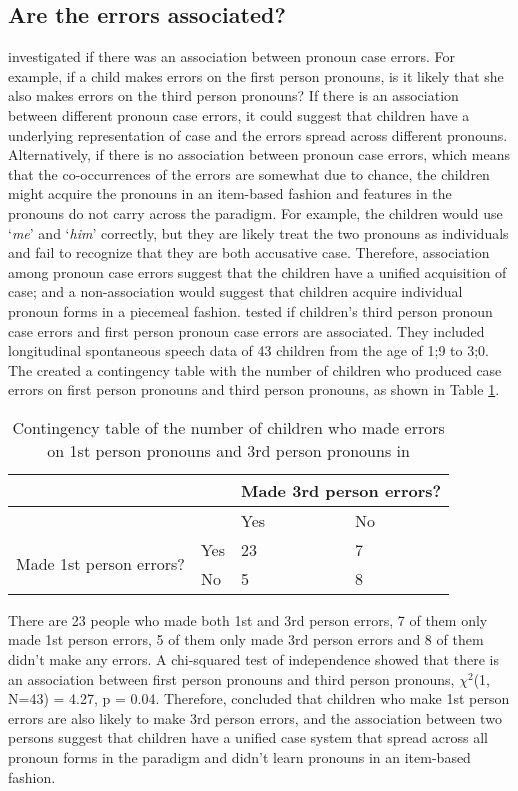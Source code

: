\subsection{Are the errors associated?}
\cite{fitzgerald2017case} investigated if there was an association between pronoun case errors. For example, if a child makes errors on the first person pronouns, is it likely that she also makes errors on the third person pronouns? If there is an association between different pronoun case errors, it could suggest that children have a underlying representation of case and the errors spread across different pronouns. Alternatively, if there is no association between pronoun case errors, which means that the co-occurrences of the errors are somewhat due to chance, the children might acquire the pronouns in an item-based fashion and features in the pronouns do not carry across the paradigm. For example, the children would use `\textit{me}' and `\textit{him}' correctly, but they are likely treat the two pronouns as individuals and fail to recognize that they are both accusative case. Therefore, association among pronoun case errors suggest that the children have a unified acquisition of case; and a non-association would suggest that children acquire individual pronoun forms in a piecemeal fashion. 
\cite{fitzgerald2017case} tested if children's third person pronoun case errors and first person pronoun case errors are associated. They included longitudinal spontaneous speech data of 43 children from the age of 1;9 to 3;0. The created a contingency table with the number of children who produced case errors on first person pronouns and third person pronouns, as shown in Table \ref{tab:lakkll}. 
\FloatBarrier
\begin{table}[!h]
\centering
\caption{Contingency table of the number of children who made errors on 1st person pronouns and 3rd person pronouns in \cite{fitzgerald2017case}}
\label{tab:lakkll}
\begin{tabular}{llll}
\toprule
 &  & \multicolumn{2}{l}{Made 3rd person errors?} \\ \hline
 &  & Yes & No \\
\multirow{2}{*}{Made 1st person errors?} & Yes & 23 & 7 \\
 & No & 5 & 8\\
 \bottomrule
\end{tabular}
\end{table}
\FloatBarrier
There are 23 people who made both 1st and 3rd person errors, 7 of them only made 1st person errors, 5 of them only made 3rd person errors and 8 of them didn't make any errors. A chi-squared test of independence showed that there is an association between first person pronouns and third person pronouns, $\chi^2$(1, N=43) = 4.27, p = 0.04. Therefore, \cite{fitzgerald2017case} concluded that children who make 1st person errors are also likely to make 3rd person errors, and the association between two persons suggest that children have a unified case system that spread across all pronoun forms in the paradigm and didn't learn pronouns in an item-based fashion. 

